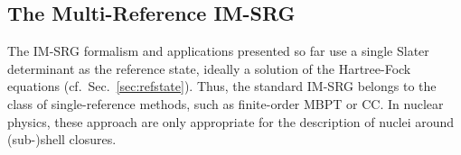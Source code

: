 

\subsection{The Multi-Reference IM-SRG}
\label{sec:mrimsrg}

The IM-SRG formalism and applications presented so far use a single
Slater determinant as the reference state, ideally a solution of the
Hartree-Fock equations (cf.~Sec.~\ref{sec:refstate}). Thus, the
standard IM-SRG belongs to the class of single-reference methods, such
as finite-order MBPT or CC. In nuclear physics, these approach are
only appropriate for the description of nuclei around (sub-)shell
closures.

